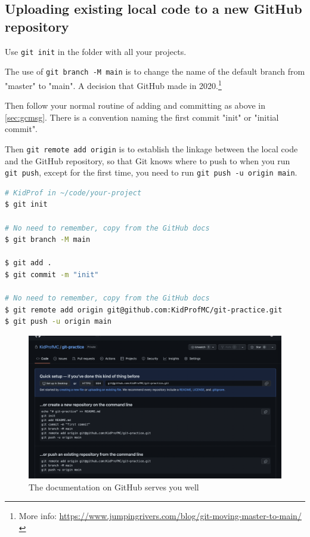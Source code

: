 \subsection{Uploading existing local code to a new GitHub repository}

Use \texttt{git init} in the folder with all your projects.

The use of \texttt{git branch -M main} is to change the name of the default branch from "master" to "main". A decision that GitHub made in 2020.\footnote{More info: \url{https://www.jumpingrivers.com/blog/git-moving-master-to-main/}}

Then follow your normal routine of adding and committing as above in \cref{sec:gcmsg}. There is a convention naming the first commit "init" or "initial commit".

Then \texttt{git remote add origin} is to establish the linkage between the local code and the GitHub repository, so that Git knows where to push to when you run \texttt{git push}, except for the first time, you need to run \texttt{git push -u origin main}.

\begin{lstlisting}[language=bash]
# KidProf in ~/code/your-project
$ git init

# No need to remember, copy from the GitHub docs
$ git branch -M main 

$ git add .
$ git commit -m "init"

# No need to remember, copy from the GitHub docs
$ git remote add origin git@github.com:KidProfMC/git-practice.git
$ git push -u origin main
\end{lstlisting}

\begin{figure}[h]
\centering
\includegraphics[width=15cm]{images/ch3-newrepocode.png}
\caption{The documentation on GitHub serves you well}
\end{figure}

